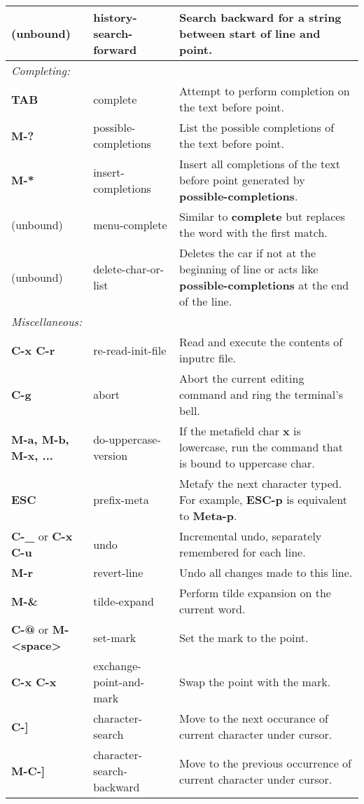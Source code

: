 \documentclass{article}
\begin{document}
\begin{tabular}{|p{3.5cm}|p{4cm}|p{10cm}|}
(unbound) & history-search-forward &  Search backward for a string between start of line and point. \\
\hline
\multicolumn{3}{|l|}{\small\it{Completing:}} \\
\hline
\textbf{TAB} & complete & Attempt to perform completion on the text before point. \\
\hline
\textbf{M-?} & possible-completions & List the possible completions of the text before point. \\
\hline
\textbf{M-*} & insert-completions & Insert all completions of the text before point generated by \textbf{possible-completions}. \\
\hline
(unbound) & menu-complete & Similar to \textbf{complete} but replaces the word with the first match. \\
(unbound) & delete-char-or-list & Deletes the car if not at the beginning of line or acts like \textbf{possible-completions} at the end of the line. \\
\hline
\multicolumn{3}{|l|}{\small\it{Miscellaneous:}} \\
\hline
\textbf{C-x C-r} & re-read-init-file & Read and execute the contents of inputrc file. \\
\hline
\textbf{C-g} & abort & Abort the current editing command and ring the terminal's bell. \\
\hline
\textbf{M-a, M-b, M-x, ...} & do-uppercase-version & If the metafield char \textbf{x} is lowercase, run the command that is bound to uppercase char. \\
\hline
\textbf{ESC} & prefix-meta & Metafy the next character typed. For example, \textbf{ESC-p} is equivalent to \textbf{Meta-p}. \\
\hline
\textbf{C-\_} or \textbf{C-x C-u}& undo & Incremental undo, separately remembered for each line. \\
\hline
\textbf{M-r} & revert-line & Undo all changes made to this line. \\
\hline
\textbf{M-\&} & tilde-expand & Perform tilde expansion on the current word. \\
\hline
\textbf{C-@} or \textbf{M-{\textless}space{\textgreater}}& set-mark & Set the mark to the point. \\
\hline
\textbf{C-x C-x} & exchange-point-and-mark & Swap the point with the mark. \\
\hline
\textbf{C-]} & character-search & Move to the next occurance of current character under cursor. \\
\hline
\textbf{M-C-]} & character-search-backward & Move to the previous occurrence of current character under cursor. \\

\end{tabular}
\end{document}
